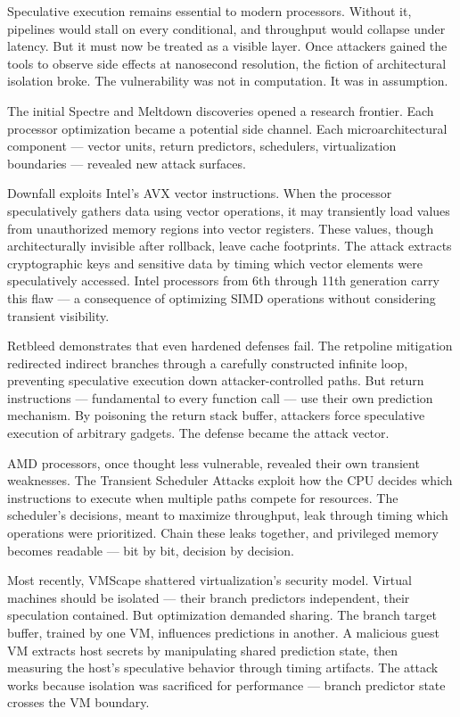 Speculative execution remains essential to modern processors. Without it, pipelines would stall on every conditional, and throughput would collapse under latency. But it must now be treated as a visible layer. Once attackers gained the tools to observe side effects at nanosecond resolution, the fiction of architectural isolation broke. The vulnerability was not in computation. It was in assumption.

The initial Spectre and Meltdown discoveries opened a research frontier. Each processor optimization became a potential side channel. Each microarchitectural component — vector units, return predictors, schedulers, virtualization boundaries — revealed new attack surfaces.

Downfall exploits Intel's AVX vector instructions. When the processor speculatively gathers data using vector operations, it may transiently load values from unauthorized memory regions into vector registers. These values, though architecturally invisible after rollback, leave cache footprints. The attack extracts cryptographic keys and sensitive data by timing which vector elements were speculatively accessed. Intel processors from 6th through 11th generation carry this flaw — a consequence of optimizing SIMD operations without considering transient visibility.

Retbleed demonstrates that even hardened defenses fail. The retpoline mitigation redirected indirect branches through a carefully constructed infinite loop, preventing speculative execution down attacker-controlled paths. But return instructions — fundamental to every function call — use their own prediction mechanism. By poisoning the return stack buffer, attackers force speculative execution of arbitrary gadgets. The defense became the attack vector.

AMD processors, once thought less vulnerable, revealed their own transient weaknesses. The Transient Scheduler Attacks exploit how the CPU decides which instructions to execute when multiple paths compete for resources. The scheduler's decisions, meant to maximize throughput, leak through timing which operations were prioritized. Chain these leaks together, and privileged memory becomes readable — bit by bit, decision by decision.

Most recently, VMScape shattered virtualization's security model. Virtual machines should be isolated — their branch predictors independent, their speculation contained. But optimization demanded sharing. The branch target buffer, trained by one VM, influences predictions in another. A malicious guest VM extracts host secrets by manipulating shared prediction state, then measuring the host's speculative behavior through timing artifacts. The attack works because isolation was sacrificed for performance — branch predictor state crosses the VM boundary.

